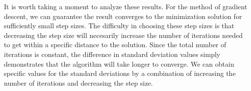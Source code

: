 \documentclass[12pt]{report}
\numberwithin{definition}{section}
\begin{document}
It is worth taking a moment to analyze these results.
For the method of gradient descent, we can guarantee the result converges to the minimization solution for sufficiently small step sizes\cite{curry}.
The difficulty in choosing these step sizes is that decreasing the step size will necesarily increase the number of iterations needed to get within a specific distance to the solution.
Since the total number of iterations is constant, the difference in standard deviation values simply demonstrates that the algorithm will take longer to converge. 
We can obtain specific values for the standard deviations by a combination of increasing the number of iterations and decreasing the step size.


\break

 
 
\printbibliography
 
\end{document}
